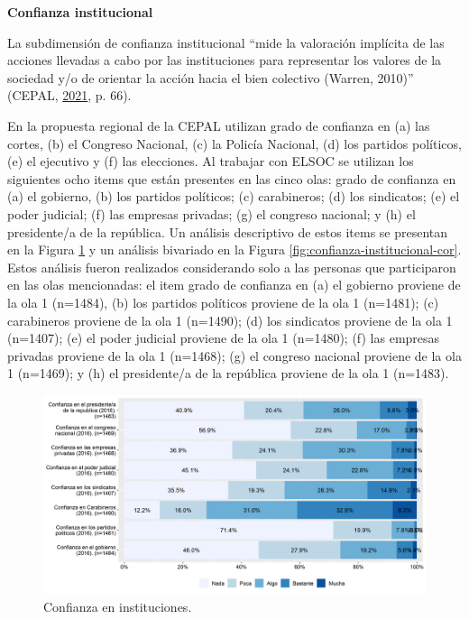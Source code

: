 \documentclass[
  12pt,
]{book}
\begin{document}
\textbf{Confianza institucional}

La subdimensión de confianza institucional ``mide la valoración implícita de las acciones llevadas a cabo por las instituciones para representar los valores de la sociedad y/o de orientar la acción hacia el bien colectivo (Warren, 2010)'' (CEPAL, \protect\hyperlink{ref-cepal_cohesion_2021}{2021}, p. 66).

En la propuesta regional de la CEPAL utilizan grado de confianza en (a) las cortes, (b) el Congreso Nacional, (c) la Policía Nacional, (d) los partidos políticos, (e) el ejecutivo y (f) las elecciones. Al trabajar con ELSOC se utilizan los siguientes ocho items que están presentes en las cinco olas: grado de confianza en (a) el gobierno, (b) los partidos políticos; (c) carabineros; (d) los sindicatos; (e) el poder judicial; (f) las empresas privadas; (g) el congreso nacional; y (h) el presidente/a de la república. Un análisis descriptivo de estos items se presentan en la Figura \ref{fig:confianza-institucional} y un análisis bivariado en la Figura \ref{fig:confianza-institucional-cor}. Estos análisis fueron realizados considerando solo a las personas que participaron en las olas mencionadas: el item grado de confianza en (a) el gobierno proviene de la ola 1 (n=1484), (b) los partidos políticos proviene de la ola 1 (n=1481); (c) carabineros proviene de la ola 1 (n=1490); (d) los sindicatos proviene de la ola 1 (n=1407); (e) el poder judicial proviene de la ola 1 (n=1480); (f) las empresas privadas proviene de la ola 1 (n=1468); (g) el congreso nacional proviene de la ola 1 (n=1469); y (h) el presidente/a de la república proviene de la ola 1 (n=1483).

\begin{figure}[H]

{\centering \includegraphics[width=1\linewidth,height=1\textheight]{output/graphs/confianza-institucional} 

}

\caption{Confianza en instituciones.}\label{fig:confianza-institucional}
\end{figure}
\end{document}
